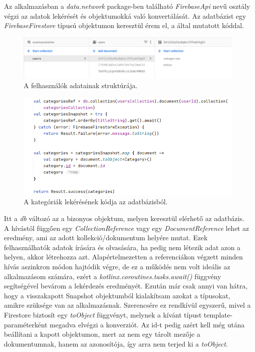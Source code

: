 Az alkalmazásban a \emph{data.network} package-ben található \emph{FirebaseApi} nevű osztály végzi az adatok lekérését és objektumokká való konvertálását. Az adatbázist egy \emph{FirebaseFirestore} típusú objektumon keresztül érem el, a  által mutatott kóddal.

\begin{figure}[!ht]
	\centering
	\includegraphics[width=150mm, keepaspectratio]{figures/firestore.png}
	\caption{A felhasználók adatainak struktúrája.}
	\label{fig:Firestore}
\end{figure}

\begin{figure}[!ht]
	\centering
	\includegraphics[width=150mm, keepaspectratio]{figures/firestore_query.png}
	\caption{A kategóriák lekérésének kódja az adatbázisból.}
	\label{fig:FirestoreQuery}
\end{figure}

Itt a \emph{db} változó az a bizonyos objektum, melyen keresztül elérhető az adatbázis. A hívástól függően egy \emph{CollectionReference} vagy egy \emph{DocumentReference} lehet az eredmény, ami az adott kollekció/dokumentum helyére mutat. Ezek felhasználhatók adatok írására és olvasására, ha pedig nem létezik adat azon a helyen, akkor létrehozza azt. Alapértelmezetten a referenciákon végzett minden hívás aszinkron módon hajtódik végre, de ez a működés nem volt ideális az alkalmazásom számára, ezért a \emph{kotlinx.coroutines.tasks.await()} függvény segítségével bevárom a lekérdezés eredményét. Ezután már csak annyi van hátra, hogy a visszakapott Snapshot objektumból kialakítsam azokat a típusokat, amikre szüksége van az alkalmazásnak. Szerencsére ez rendkívül egyszerű, mivel a Firestore biztosít egy \emph{toObject} függvényt, melynek a kívánt típust template-paraméterként megadva elvégzi a konverziót. Az id-t pedig azért kell még utána beállítani a kapott objektumon, mert az nem egy tárolt mezője a dokumentumnak, hanem az azonosítója, így arra nem terjed ki a \emph{toObject}.

